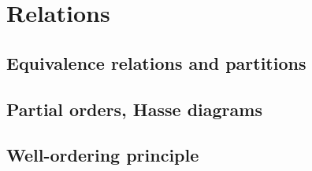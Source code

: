 
\section{Relations}

\subsection{Equivalence relations and partitions}


\subsection{Partial orders, Hasse diagrams}


\subsection{Well-ordering principle}


